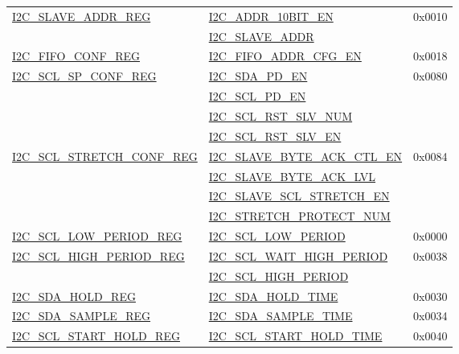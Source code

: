\documentclass[main\_\_EN.tex]{subfiles}
\begin{document}
\begin{longtable}{ | p{6cm} | p{7cm} | p{2cm} | }
\hyperref[regdesc:I2CSLAVEADDRREG]{I2C\_SLAVE\_ADDR\_REG} & {\hyperref[fielddesc:I2CADDR10BITEN]{I2C\_ADDR\_10BIT\_EN}} & 0x0010 \\\cline{2-2}
& {\hyperref[fielddesc:I2CSLAVEADDR]{I2C\_SLAVE\_ADDR}}& \\ \hline
\hyperref[regdesc:I2CFIFOCONFREG]{I2C\_FIFO\_CONF\_REG} & {\hyperref[fielddesc:I2CFIFOADDRCFGEN]{I2C\_FIFO\_ADDR\_CFG\_EN}} & 0x0018 \\ \hline
\hyperref[regdesc:I2CSCLSPCONFREG]{I2C\_SCL\_SP\_CONF\_REG} & {\hyperref[fielddesc:I2CSDAPDEN]{I2C\_SDA\_PD\_EN}} & 0x0080  \\\cline{2-2}
& {\hyperref[fielddesc:I2CSCLPDEN]{I2C\_SCL\_PD\_EN}}& \\\cline{2-2}
& {\hyperref[fielddesc:I2CSCLRSTSLVNUM]{I2C\_SCL\_RST\_SLV\_NUM}}& \\\cline{2-2}
& {\hyperref[fielddesc:I2CSCLRSTSLVEN]{I2C\_SCL\_RST\_SLV\_EN}}& \\ \hline
\hyperref[regdesc:I2CSCLSTRETCHCONFREG]{I2C\_SCL\_STRETCH\_CONF\_REG} & {\hyperref[fielddesc:I2CSLAVEBYTEACKCTLEN]{I2C\_SLAVE\_BYTE\_ACK\_CTL\_EN}} & 0x0084  \\\cline{2-2}
& {\hyperref[fielddesc:I2CSLAVEBYTEACKLVL]{I2C\_SLAVE\_BYTE\_ACK\_LVL}}& \\\cline{2-2}
& {\hyperref[fielddesc:I2CSLAVESCLSTRETCHEN]{I2C\_SLAVE\_SCL\_STRETCH\_EN}}& \\\cline{2-2}
& {\hyperref[fielddesc:I2CSTRETCHPROTECTNUM]{I2C\_STRETCH\_PROTECT\_NUM}}& \\ \hline
\hyperref[regdesc:I2CSCLLOWPERIODREG]{I2C\_SCL\_LOW\_PERIOD\_REG} & \hyperref[fielddesc:I2CSCLLOWPERIOD]{I2C\_SCL\_LOW\_PERIOD} & 0x0000  \\ \hline
\hyperref[regdesc:I2CSCLHIGHPERIODREG]{I2C\_SCL\_HIGH\_PERIOD\_REG} & \hyperref[fielddesc:I2CSCLWAITHIGHPERIOD]{I2C\_SCL\_WAIT\_HIGH\_PERIOD} & 0x0038  \\\cline{2-2}
& \hyperref[fielddesc:I2CSCLHIGHPERIOD]{I2C\_SCL\_HIGH\_PERIOD}& \\ \hline
\hyperref[regdesc:I2CSDAHOLDREG]{I2C\_SDA\_HOLD\_REG} & \hyperref[fielddesc:I2CSDAHOLDTIME]{I2C\_SDA\_HOLD\_TIME} & 0x0030  \\\hline
\hyperref[regdesc:I2CSDASAMPLEREG]{I2C\_SDA\_SAMPLE\_REG} & \hyperref[fielddesc:I2CSDASAMPLETIME]{I2C\_SDA\_SAMPLE\_TIME} & 0x0034  \\ \hline
\hyperref[regdesc:I2CSCLSTARTHOLDREG]{I2C\_SCL\_START\_HOLD\_REG} & \hyperref[fielddesc:I2CSCLSTARTHOLDTIME]{I2C\_SCL\_START\_HOLD\_TIME} & 0x0040  \\ \hline

\end{longtable}
\end{document}
